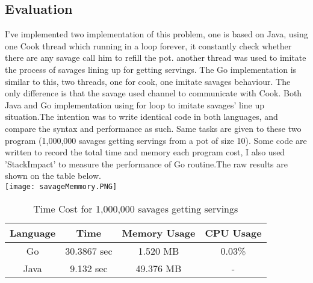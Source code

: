 \documentclass[a4paper,10pt]{article}
\begin{document}
\subsection{Evaluation}
I've implemented two implementation of this problem, one is based on Java, using one Cook thread which running in a loop forever, it constantly check whether there are any savage call him to refill the pot. another thread was used to imitate the process of savages lining up for getting servings. The Go implementation is similar to this, two threads, one for cook, one imitate savages behaviour. The only difference is that the savage used channel to communicate with Cook. Both Java and Go implementation using for loop to imitate savages' line up situation.The intention was to write identical code in both languages, and compare the syntax and performance as such.
Same tasks are given to these two program (1,000,000 savages getting servings from a pot of size 10). Some code are written to record the total time and memory each program cost, I also used 'StackImpact' to measure the performance of Go routine.The raw results are shown on the table below.\\
\texttt{[image: savageMemmory.PNG]}\\
\begin{table}[h]
    \centering
    \begin{tabular}{|c|c|c|c|}
    \hline
        \textbf{Language} & \textbf{Time}& \textbf{Memory Usage}& \textbf{CPU Usage}\\\hline
        Go & 30.3867 sec & 1.520 MB & 0.03\%\\\hline
        Java & 9.132 sec & 49.376 MB & -\\\hline
    \end{tabular}
    \caption{Time Cost for 1,000,000 savages getting servings}
\end{table}

\clearpage
\end{document}
